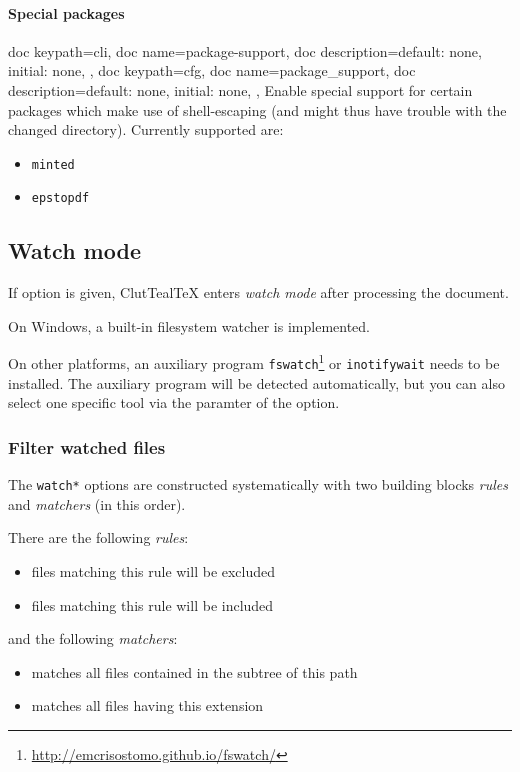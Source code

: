 \documentclass[a4paper, 11pt]{scrartcl}
\let\TeXold\TeX
\newcommand\CluttealTeX{ClutTeal\TeX\xspace}
\renewcommand\TeX{\TeXold\xspace}
\begin{document}
\paragraph{Special packages}
\begin{docKeys}[
		doc parameter={=\meta{package\_support}},
	]{
		{
			doc keypath=cli,
			doc name=package-support,
			doc description={default: none, initial: none},
		},
		{
			doc keypath=cfg,
			doc name=package_support,
			doc description={default: none, initial: none},
		},
	}
	Enable special support for certain packages which make use of shell-escaping (and might thus have trouble with the changed directory).
	Currently supported are:
	\begin{multicols}{2}
		\begin{itemize}
			\item \texttt{minted}
			\item \texttt{epstopdf}
		\end{itemize}
	\end{multicols}
\end{docKeys}

\subsection{Watch mode}\label{sec:watch-mode}
If  option is given, \CluttealTeX enters \emph{watch mode} after processing the document.

On Windows, a built-in filesystem watcher is implemented.

On other platforms, an auxiliary program \texttt{fswatch}\footnote{\url{http://emcrisostomo.github.io/fswatch/}} or \texttt{inotifywait} needs to be installed.
The auxiliary program will be detected automatically, but you can also select one specific tool via the paramter of the  option.

\subsubsection{Filter watched files}
The \texttt{watch*} options are constructed systematically with two building blocks \emph{rules} and \emph{matchers} (in this order).

There are the following \emph{rules}:
\begin{itemize}
	\item {} files matching this rule will be excluded
	\item {} files matching this rule will be included
\end{itemize}
and the following \emph{matchers}:
\begin{itemize}
	\item {} matches all files contained in the subtree of this path
	\item {} matches all files having this extension
\end{itemize}
\end{document}
